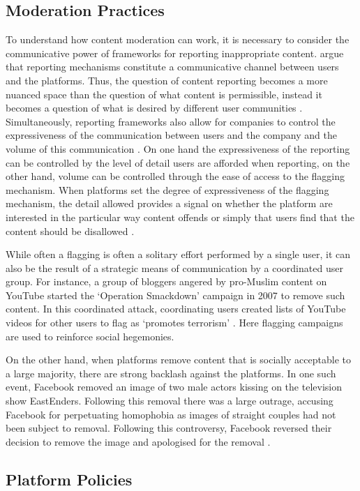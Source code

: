 \subsection{Moderation Practices}
To understand how content moderation can work, it is necessary to consider the communicative power of frameworks for reporting inappropriate content.
\citet{Crawford:2016} argue that reporting mechanisms constitute a communicative channel between users and the platforms.
Thus, the question of content reporting becomes a more nuanced space than the question of what content is permissible, instead it becomes a question of what is desired by different user communities \citep{Crawford:2016}.
Simultaneously, reporting frameworks also allow for companies to control the expressiveness of the communication between users and the company and the volume of this communication \citep{Crawford:2016}.
On one hand the expressiveness of the reporting can be controlled by the level of detail users are afforded when reporting, on the other hand, volume can be controlled through the ease of access to the flagging mechanism.
When platforms set the degree of expressiveness of the flagging mechanism, the detail allowed provides a signal on whether the platform are interested in the particular way content offends or simply that users find that the content should be disallowed \citep{Crawford:2016}.

While often a flagging is often a solitary effort performed by a single user, it can also be the result of a strategic means of communication by a coordinated user group.
For instance, a group of bloggers angered by pro-Muslim content on YouTube started the `Operation Smackdown' campaign in 2007 to remove such content.
In this coordinated attack, coordinating users created lists of YouTube videos for other users to flag as `promotes terrorism' \citep{Crawford:2016}.
Here flagging campaigns are used to reinforce social hegemonies.

On the other hand, when platforms remove content that is socially acceptable to a large majority, there are strong backlash against the platforms.
In one such event, Facebook removed an image of two male actors kissing on the television show EastEnders.
Following this removal there was a large outrage, accusing Facebook for perpetuating homophobia as images of straight couples had not been subject to removal.
Following this controversy, Facebook reversed their decision to remove the image and apologised for the removal \citep{Crawford:2016}.

\subsection{Platform Policies}

